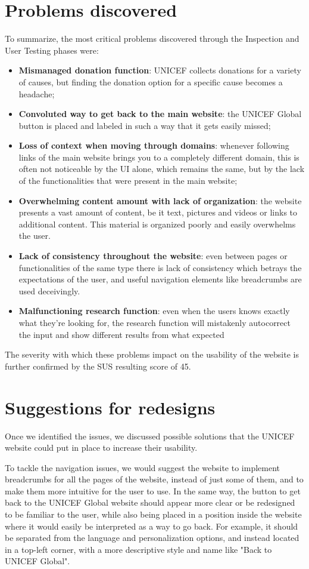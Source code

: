 \section{Problems discovered}
To summarize, the most critical problems discovered through the Inspection and User Testing phases were:
\begin{itemize}
    \item \textbf{Mismanaged donation function}: UNICEF collects donations for a variety of causes, but finding the donation option for a specific cause becomes a headache;
    \item \textbf{Convoluted way to get back to the main website}: the UNICEF Global button is placed and labeled in such a way that it gets easily missed;
    \item \textbf{Loss of context when moving through domains}: whenever following links of the main website brings you to a completely different domain, this is often not noticeable by the UI alone, which remains the same, but by the lack of the functionalities that were present in the main website;
    \item \textbf{Overwhelming content amount with lack of organization}: the website presents a vast amount of content, be it text, pictures and videos or links to additional content. This material is organized poorly and easily overwhelms the user.
    \item \textbf{Lack of consistency throughout the website}: even between pages or functionalities of the same type there is lack of consistency which betrays the expectations of the user, and useful navigation elements like breadcrumbs are used deceivingly.
    \item \textbf{Malfunctioning research function}: even when the users knows exactly what they're looking for, the research function will mistakenly autocorrect the input and show different results from what expected
\end{itemize}

The severity with which these problems impact on the usability of the website is further confirmed by the SUS resulting score of 45.

\section{Suggestions for redesigns}
Once we identified the issues, we discussed possible solutions that the UNICEF website could put in place to increase their usability.

To tackle the navigation issues, we would suggest the website to implement breadcrumbs for all the pages of the website, instead of just some of them, and to make them more intuitive for the user to use. In the same way, the button to get back to the UNICEF Global website should appear more clear or
be redesigned to be familiar to the user, while also being placed in a position inside the website where it would easily be interpreted as a way to go back. For example, it should be separated from the language and personalization options, and instead located in a top-left corner, with a more descriptive style and name like "Back to UNICEF Global".

